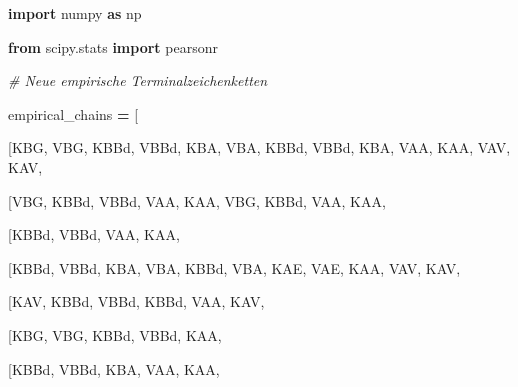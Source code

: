 \documentclass[
]{article}
\begin{document}
\textbf{import} numpy \textbf{as} np

\textbf{from} scipy.stats \textbf{import} pearsonr

\emph{\# Neue empirische Terminalzeichenketten}

empirical\_chains \textbf{=} {[}

{[}\textquotesingle KBG\textquotesingle,
\textquotesingle VBG\textquotesingle,
\textquotesingle KBBd\textquotesingle,
\textquotesingle VBBd\textquotesingle,
\textquotesingle KBA\textquotesingle,
\textquotesingle VBA\textquotesingle,
\textquotesingle KBBd\textquotesingle,
\textquotesingle VBBd\textquotesingle,
\textquotesingle KBA\textquotesingle,
\textquotesingle VAA\textquotesingle,
\textquotesingle KAA\textquotesingle,
\textquotesingle VAV\textquotesingle,
\textquotesingle KAV\textquotesingle{]},

{[}\textquotesingle VBG\textquotesingle,
\textquotesingle KBBd\textquotesingle,
\textquotesingle VBBd\textquotesingle,
\textquotesingle VAA\textquotesingle,
\textquotesingle KAA\textquotesingle,
\textquotesingle VBG\textquotesingle,
\textquotesingle KBBd\textquotesingle,
\textquotesingle VAA\textquotesingle,
\textquotesingle KAA\textquotesingle{]},

{[}\textquotesingle KBBd\textquotesingle,
\textquotesingle VBBd\textquotesingle,
\textquotesingle VAA\textquotesingle,
\textquotesingle KAA\textquotesingle{]},

{[}\textquotesingle KBBd\textquotesingle,
\textquotesingle VBBd\textquotesingle,
\textquotesingle KBA\textquotesingle,
\textquotesingle VBA\textquotesingle,
\textquotesingle KBBd\textquotesingle,
\textquotesingle VBA\textquotesingle,
\textquotesingle KAE\textquotesingle,
\textquotesingle VAE\textquotesingle,
\textquotesingle KAA\textquotesingle,
\textquotesingle VAV\textquotesingle,
\textquotesingle KAV\textquotesingle{]},

{[}\textquotesingle KAV\textquotesingle,
\textquotesingle KBBd\textquotesingle,
\textquotesingle VBBd\textquotesingle,
\textquotesingle KBBd\textquotesingle,
\textquotesingle VAA\textquotesingle,
\textquotesingle KAV\textquotesingle{]},

{[}\textquotesingle KBG\textquotesingle,
\textquotesingle VBG\textquotesingle,
\textquotesingle KBBd\textquotesingle,
\textquotesingle VBBd\textquotesingle,
\textquotesingle KAA\textquotesingle{]},

{[}\textquotesingle KBBd\textquotesingle,
\textquotesingle VBBd\textquotesingle,
\textquotesingle KBA\textquotesingle,
\textquotesingle VAA\textquotesingle,
\textquotesingle KAA\textquotesingle{]},
\end{document}
